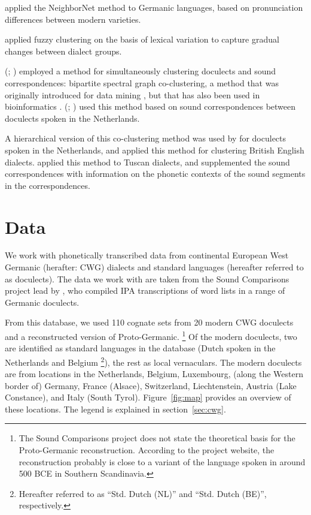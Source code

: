 \documentclass[a4paper]{article}
\begin{document}
\citet{heggarty2010splits} applied the NeighborNet method \citep{bryant2004neighbornet}
to Germanic languages, based on pronunciation differences between modern varieties.

\citet{proell2013detecting} applied fuzzy clustering on the basis of lexical variation
to capture gradual changes between dialect groups.

\citeauthor{wieling2011bipartite} (\citeyear{wieling2009bipartite}; \citeyear{wieling2011bipartite})
employed a method for simultaneously clustering doculects and
sound correspondences: bipartite spectral graph co-clustering,
a method that was originally introduced for data mining \citep{dhillon2001co-clustering, zha2001bipartite},
but that has also been used in bioinformatics \citep{kluger2003spectral}.
\citeauthor{wieling2011bipartite}
(\citeyear{wieling2009bipartite}; \citeyear{wieling2011bipartite})
used this method based on sound correspondences between doculects
spoken in the Netherlands.

A hierarchical version of this co-clustering method
was used by \citet{wieling2010hierarchical} for
doculects spoken in the Netherlands,
and \citet{wieling2013analyzing} applied this method for
clustering British English dialects.
\citet{montemagni2013synchronic} applied this method to Tuscan dialects,
and supplemented the sound correspondences with information
on the phonetic contexts of the sound segments in the correspondences.

\section{Data}
\label{sec:data}

We work with phonetically transcribed data from
continental European West Germanic (herafter: CWG) dialects and standard languages
(hereafter referred to as doculects).
The data we work with are taken from the Sound Comparisons project
lead by \citet{heggarty2018sound}, who compiled IPA transcriptions of word lists
in a range of Germanic doculects.

From this database,
we used 110 cognate sets from 20 modern CWG doculects
and a reconstructed version of Proto-Germanic.
\footnote{
The Sound Comparisons project does not state
the theoretical basis for the Proto-Germanic reconstruction.
According to the project website,
the reconstruction probably is close to
a variant of the language spoken in around 500 BCE
in Southern Scandinavia.
}
Of the modern doculects, two are identified as standard languages
in the database (Dutch spoken in the Netherlands and Belgium
\footnote{
Hereafter referred to as ``Std. Dutch (NL)'' and ``Std. Dutch (BE)'', respectively.
}),
the rest as local vernaculars.
The modern doculects are from locations in the
Netherlands, Belgium, Luxembourg, (along the Western border of) Germany,
France (Alsace), Switzerland, Liechtenstein, Austria (Lake Constance), and Italy (South Tyrol).
Figure~\ref{fig:map} provides an overview of these locations.
The legend is explained in section~\ref{sec:cwg}.
\end{document}
